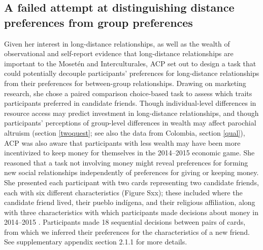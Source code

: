 \documentclass[bibauthoryear]{aa}
\begin{document}
\subsection{A failed attempt at distinguishing distance preferences from group preferences}

Given her interest in long-distance relationships, as well as the wealth of observational and self-report evidence that long-distance relationships are important to the Moset\'en and Interculturales, ACP set out to design a task that could potentially decouple participants' preferences for long-distance relationships from their preferences for between-group relationships. Drawing on marketing research, she chose a paired comparison choice-based task \citep{rao2014applied} to assess which traits participants preferred in candidate friends. Though individual-level differences in resource access may predict investment in long-distance relationships, and though participants' perceptions of group-level differences in wealth may affect parochial altruism (section \ref{twoquest}; see also the data from Colombia, section \ref{qual}), ACP was also aware that participants with less wealth may have been more incentivized to keep money for themselves in the 2014--2015 economic game. She reasoned that a task not involving money might reveal preferences for forming new social relationships independently of preferences for giving or keeping money. She presented each participant with two cards representing two candidate friends, each with six different characteristics (Figure Sxx); these included where the candidate friend lived, their pueblo ind\'igena, and their religious affiliation, along with three characteristics with which participants made decisions about money in 2014--2015 \citep{pisor2018diversify}. Participants made 18 sequential decisions between pairs of cards, from which we inferred their preferences for the characteristics of a new friend. See supplementary appendix section 2.1.1 for more details.
\end{document}
